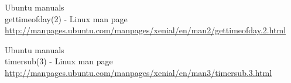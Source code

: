 \documentclass[paper=a4, fontsize=11pt]{scrartcl} %
\numberwithin{equation}{section} %
\numberwithin{figure}{section} %
\numberwithin{table}{section} %
\begin{document}
\begin{thebibliography}{10}
Ubuntu manuals\\
gettimeofday(2) - Linux man page\\
  \url{http://manpages.ubuntu.com/manpages/xenial/en/man2/gettimeofday.2.html}

Ubuntu manuals\\
timersub(3) - Linux man page\\
  \url{http://manpages.ubuntu.com/manpages/xenial/en/man3/timersub.3.html}

\end{thebibliography}
\end{document}
